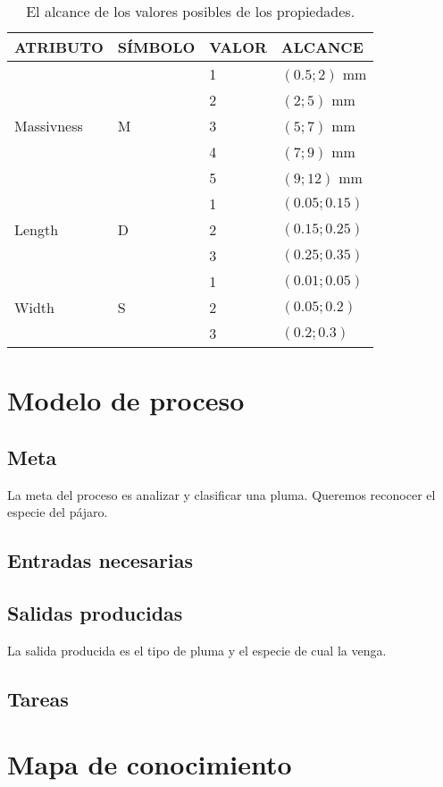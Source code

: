 \documentclass[a4paper,12pt]{article}
\begin{document}
\begin{table}[H]
	\centering
	\begin{tabular}{|l|l|l|l|}
		\hline
		ATRIBUTO                    & SÍMBOLO            & VALOR & ALCANCE       \\ \hline\hline
		\multirow{5}{*}{Massivness} & \multirow{5}{*}{M} & 1     & $(0.5;2)$ mm  \\ \cline{3-4}
		                            &                    & 2     & $(2;5)$ mm    \\ \cline{3-4}
		                            &                    & 3     & $(5;7)$ mm    \\ \cline{3-4}
		                            &                    & 4     & $(7;9)$ mm    \\ \cline{3-4}
		                            &                    & 5     & $(9;12)$ mm   \\ \hline\hline
		\multirow{3}{*}{Length}     & \multirow{3}{*}{D} & 1     & $(0.05;0.15)$ \\ \cline{3-4}
		                            &                    & 2     & $(0.15;0.25)$ \\ \cline{3-4}
		                            &                    & 3     & $(0.25;0.35)$ \\ \hline\hline
		\multirow{3}{*}{Width}      & \multirow{3}{*}{S} & 1     & $(0.01;0.05)$ \\ \cline{3-4}
		                            &                    & 2     & $(0.05;0.2)$  \\ \cline{3-4}
		                            &                    & 3     & $(0.2;0.3)$   \\ \hline
	\end{tabular}
	\caption{El alcance de los valores posibles de los propiedades.}
\end{table}

\section{Modelo de proceso}
\subsection{Meta}
La meta del proceso es analizar y clasificar una pluma. Queremos reconocer el especie del pájaro.

\subsection{Entradas necesarias}

\subsection{Salidas producidas}
La salida producida es el tipo de pluma y el especie de cual la venga.

\subsection{Tareas}

\section{Mapa de conocimiento}
\end{document}
